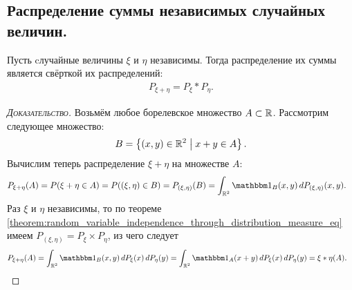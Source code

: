 \documentclass[../main.tex]{subfiles}
\begin{document}
\subsection{Распределение суммы независимых случайных величин.}

\begin{thm}
 \label{theorem:distribution_of_sum_is_measure_convolution}
 Пусть cлучайные величины $ \xi $ и $ \eta $ независимы. Тогда распределение их суммы является свёрткой их распределений:
 \begin{align*}
  P_{\xi + \eta} = P_\xi \ast P_\eta.
 \end{align*}
\end{thm}
\begin{proof}[\normalfont\textsc{Доказательство}]
 Возьмём любое борелевское множество $ A \subset \mathbb{R} $. Рассмотрим следующее множество:
 \begin{align*}
  B = \left\{ (x, y) \in \mathbb{R}^{2} \;\middle|\; x + y \in A \right\}.
 \end{align*} Вычислим теперь распределение $ \xi + \eta $ на множестве $ A $:
 \begin{align*}
  P_{\xi+\eta}(A) &= P(\xi + \eta \in A) = P((\xi,\eta)\in B) = P_{(\xi,\eta)}(B) = \int_{\R^{2}} \Ind_B(x,y) \,dP_{(\xi,\eta)}(x,y).
 \end{align*} Раз $ \xi $ и $ \eta $ независимы, то по теореме \ref{theorem:random_variable_independence_through_distribution_measure_eq} имеем $ P_{(\xi,\eta)} = P_\xi \times P_\eta $, из чего следует
 \begin{align*}
  P_{\xi+\eta}(A) &= \int_{\R^{2}} \Ind_B(x,y)\,dP_\xi(x)\,dP_\eta(y) = \int_{\R^{2}} \Ind_A(x + y) \,dP_\xi(x)\, dP_\eta(y) = \xi \ast \eta(A).
 \end{align*} 
\end{proof}
\end{document}
